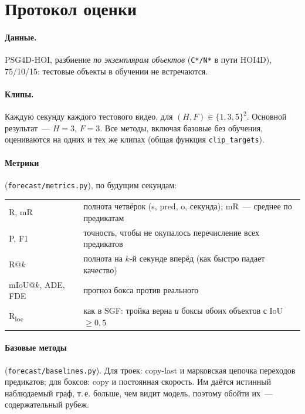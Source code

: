 \documentclass[11pt,a4paper]{article}
\newcommand{\code}[1]{\texttt{#1}}
\begin{document}
\section{Протокол оценки}

\paragraph{Данные.} PSG4D-HOI, разбиение \emph{по экземплярам объектов} (\code{C*/N*} в пути
HOI4D), 75/10/15: тестовые объекты в обучении не встречаются.

\paragraph{Клипы.} Каждую секунду каждого тестового видео, для $(H,F)\in\{1,3,5\}^2$.
Основной результат~--- $H=3$, $F=3$. Все методы, включая базовые без обучения, оцениваются
на одних и тех же клипах (общая функция \code{clip\_targets}).

\paragraph{Метрики} (\code{forecast/metrics.py}), по будущим секундам:
\begin{center}
\begin{tabularx}{\linewidth}{@{}lL@{}}
\toprule
R, mR & полнота четвёрок (s, pred, o, секунда); mR~--- среднее по предикатам \\
P, F1 & точность, чтобы не окупалось перечисление всех предикатов \\
R@$k$ & полнота на $k$-й секунде вперёд (как быстро падает качество) \\
mIoU@$k$, ADE, FDE & прогноз бокса против реального \\
R\textsubscript{loc} & как в SGF: тройка верна \emph{и} боксы обоих объектов с IoU $\ge 0{,}5$ \\
\bottomrule
\end{tabularx}
\end{center}

\paragraph{Базовые методы} (\code{forecast/baselines.py}). Для троек: copy-last и марковская
цепочка переходов предикатов; для боксов: copy и постоянная скорость. Им даётся истинный
наблюдаемый граф, т.\,е. больше, чем видит модель, поэтому обойти их~--- содержательный рубеж.
\end{document}

